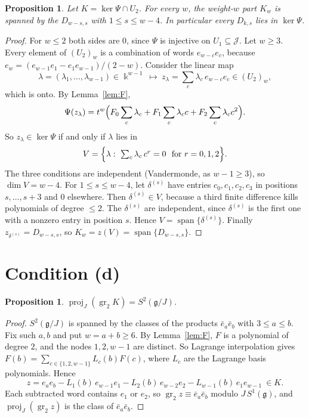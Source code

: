 \documentclass[11pt]{amsart}
\newtheorem{proposition}[theorem]{Proposition}
\theoremstyle{definition}
\theoremstyle{remark}
\newcommand{\g}{\mathfrak{g}}
\newcommand{\U}{U}
\newcommand{\cJ}{\mathcal{J}}
\newcommand{\gr}{\operatorname{gr}}
\newcommand{\proj}{\operatorname{proj}}
\newcommand{\kk}{\Bbbk}
\newcommand{\eb}{\bar e}
\begin{document}
\begin{proposition}\label{prop:K}
Let $K=\ker\Psi\cap\U_2$. For every $w$, the weight-$w$ part $K_w$ is spanned by the $D_{w-s,s}$ with $1\le s\le w-4$. In particular every $D_{k,s}$ lies in $\ker\Psi$.
\end{proposition}

\begin{proof}
For $w\le2$ both sides are $0$, since $\Psi$ is injective on $\U_1\subseteq\cJ$. Let $w\ge3$. Every element of $(\U_2)_w$ is a combination of words $e_{w-c}e_c$, because $e_w=(e_{w-1}e_1-e_1e_{w-1})/(2-w)$. Consider the linear map
\[
\lambda=(\lambda_1,\dots,\lambda_{w-1})\in\kk^{w-1}\ \longmapsto\ z_\lambda=\sum_c\lambda_c\,e_{w-c}e_c\in(\U_2)_w ,
\]
which is onto. By Lemma~\ref{lem:F},
\[
\Psi(z_\lambda)=t^w\Bigl(F_0\sum_c\lambda_c+F_1\sum_c\lambda_cc+F_2\sum_c\lambda_cc^2\Bigr).
\]
So $z_\lambda\in\ker\Psi$ if and only if $\lambda$ lies in
\[
V=\Bigl\{\lambda:\ \textstyle\sum_c\lambda_c\,c^r=0\ \text{ for } r=0,1,2\Bigr\}.
\]
The three conditions are independent (Vandermonde, as $w-1\ge3$), so $\dim V=w-4$. For $1\le s\le w-4$, let $\delta^{(s)}$ have entries $c_0,c_1,c_2,c_3$ in positions $s,\dots,s+3$ and $0$ elsewhere. Then $\delta^{(s)}\in V$, because a third finite difference kills polynomials of degree $\le2$. The $\delta^{(s)}$ are independent, since $\delta^{(s)}$ is the first one with a nonzero entry in position $s$. Hence $V=\operatorname{span}\{\delta^{(s)}\}$. Finally $z_{\delta^{(s)}}=D_{w-s,s}$, so $K_w=z(V)=\operatorname{span}\{D_{w-s,s}\}$.
\end{proof}

\section{Condition (d)}

\begin{proposition}\label{prop:d}
$\proj_J(\gr_2K)=S^2(\g/J)$.
\end{proposition}

\begin{proof}
$S^2(\g/J)$ is spanned by the classes of the products $\eb_a\eb_b$ with $3\le a\le b$. Fix such $a,b$ and put $w=a+b\ge6$. By Lemma~\ref{lem:F}, $F$ is a polynomial of degree $2$, and the nodes $1,2,w-1$ are distinct. So Lagrange interpolation gives $F(b)=\sum_{c\in\{1,2,w-1\}}L_c(b)F(c)$, where $L_c$ are the Lagrange basis polynomials. Hence
\[
z=e_ae_b-L_1(b)\,e_{w-1}e_1-L_2(b)\,e_{w-2}e_2-L_{w-1}(b)\,e_1e_{w-1}\ \in K .
\]
Each subtracted word contains $e_1$ or $e_2$, so $\gr_2z\equiv\eb_a\eb_b$ modulo $J\,S^1(\g)$, and $\proj_J(\gr_2z)$ is the class of $\eb_a\eb_b$.
\end{proof}
\end{document}
